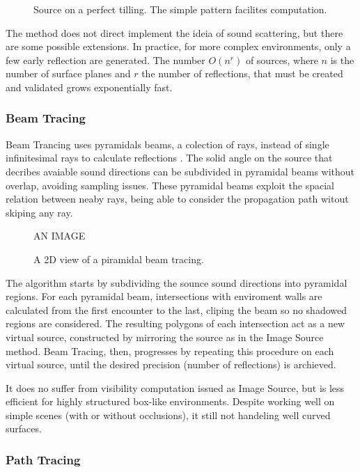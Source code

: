 \begin{figure}[h]
	\centering
	
	\caption{Source on a perfect tilling. The simple pattern facilites
	computation.}
	\label{fig:tillingsource}
\end{figure}

The method does not direct implement the ideia of sound scattering, but there
are some possible extensions\cite{chandak2011fast}. In practice, for more
complex environments, only a few early reflection are generated. The number
$O(n^r)$ of sources, where $n$ is the number of surface planes and $r$ the
number of reflections, that must be created and validated grows exponentially
fast.

\subsubsection{Beam Tracing}

Beam Trancing uses pyramidals beams, a colection of rays, instead of single
infinitesimal rays to calculate reflections \cite{funkhouser2003survey}. The
solid angle on the source that decribes avaiable sound directions can be
subdivided in pyramidal beams without overlap, avoiding sampling issues. These
pyramidal beams exploit the spacial relation between neaby rays, being able to
consider the propagation path witout skiping any ray.

\begin{figure}[h]
	\centering
	AN IMAGE
	\caption{A 2D view of a piramidal beam tracing.}
	\label{fig:beamtrace}
\end{figure}

The algorithm starts by subdividing the sounce sound directions into pyramidal
regions. For each pyramidal beam, intersections with enviroment walls are
calculated from the first encounter to the last, cliping the beam so no
shadowed regions are considered. The resulting polygons of each intersection act
as a new virtual source, constructed by mirroring the source as in the Image
Source method. Beam Tracing, then, progresses by repeating this procedure on
each virtual source, until the desired precision (number of reflections) is
archieved.

It does no suffer from visibility computation issued as Image Source, but is
less efficient for highly structured box-like environments. Despite working well
on simple scenes (with or without occlusions), it still not handeling well
curved surfaces.


\subsubsection{Path Tracing}

